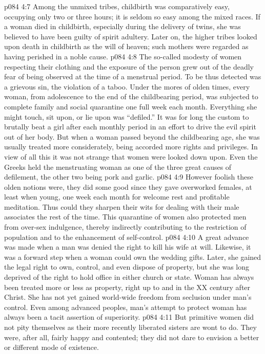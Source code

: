 \vs p084 4:7 Among the unmixed tribes, childbirth was comparatively easy, occupying only two or three hours; it is seldom so easy among the mixed races. If a woman died in childbirth, especially during the delivery of twins, she was believed to have been guilty of spirit adultery. Later on, the higher tribes looked upon death in childbirth as the will of heaven; such mothers were regarded as having perished in a noble cause.
\vs p084 4:8 The so\hyp{}called modesty of women respecting their clothing and the exposure of the person grew out of the deadly fear of being observed at the time of a menstrual period. To be thus detected was a grievous sin, the violation of a taboo. Under the mores of olden times, every woman, from adolescence to the end of the childbearing period, was subjected to complete family and social quarantine one full week each month. Everything she might touch, sit upon, or lie upon was “defiled.” It was for long the custom to brutally beat a girl after each monthly period in an effort to drive the evil spirit out of her body. But when a woman passed beyond the childbearing age, she was usually treated more considerately, being accorded more rights and privileges. In view of all this it was not strange that women were looked down upon. Even the Greeks held the menstruating woman as one of the three great causes of defilement, the other two being pork and garlic.
\vs p084 4:9 However foolish these olden notions were, they did some good since they gave overworked females, at least when young, one week each month for welcome rest and profitable meditation. Thus could they sharpen their wits for dealing with their male associates the rest of the time. This quarantine of women also protected men from over\hyp{}sex indulgence, thereby indirectly contributing to the restriction of population and to the enhancement of self\hyp{}control.
\vs p084 4:10 \pc A great advance was made when a man was denied the right to kill his wife at will. Likewise, it was a forward step when a woman could own the wedding gifts. Later, she gained the legal right to own, control, and even dispose of property, but she was long deprived of the right to hold office in either church or state. Woman has always been treated more or less as property, right up to and in the XX century after Christ. She has not yet gained world\hyp{}wide freedom from seclusion under man’s control. Even among advanced peoples, man’s attempt to protect woman has always been a tacit assertion of superiority.
\vs p084 4:11 But primitive women did not pity themselves as their more recently liberated sisters are wont to do. They were, after all, fairly happy and contented; they did not dare to envision a better or different mode of existence.
